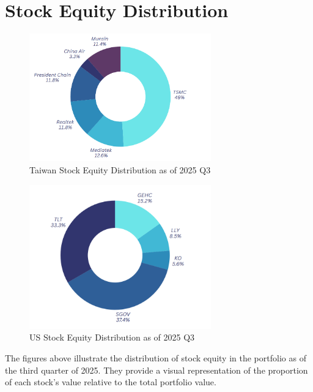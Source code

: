 \documentclass[a4paper,12pt]{article}
\begin{document}
\section{Stock Equity Distribution}
\begin{figure}[H]
    \centering
    \includegraphics[width=0.7\textwidth]{tw_stock_equity_distribution.png}
    \caption{Taiwan Stock Equity Distribution as of 2025 Q3}
    \label{fig:tw_stock_equity_distribution}
\end{figure}

\begin{figure}[H]
    \centering
    \includegraphics[width=0.7\textwidth]{us_stock_equity_distribution.png}
    \caption{US Stock Equity Distribution as of 2025 Q3}
    \label{fig:us_stock_equity_distribution}
\end{figure}

\noindent The figures above illustrate the distribution of stock equity in the portfolio as of the third quarter of 2025. They provide a visual representation of the proportion of each stock's value relative to the total portfolio value.\\
\end{document}
